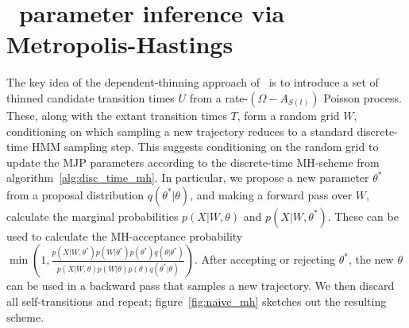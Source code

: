 \section{\Naive\ parameter inference via Metropolis-Hastings}

The key idea of the dependent-thinning approach of~\cite{RaoTeh13} is
to introduce a set of thinned candidate transition times $U$ from
a rate-$(\Omega-A_{S(t)})$ Poisson process. These, along 
with the extant transition times $T$, form a random grid $W$, conditioning on
which sampling a new trajectory reduces to a standard discrete-time 
HMM sampling step. This suggests conditioning on the random grid to update
the MJP parameters according to the discrete-time MH-scheme from
algorithm~\ref{alg:disc_time_mh}.
In particular, we propose a new parameter $\theta^*$ from a proposal 
distribution $q(\theta^*|\theta)$, and making a forward pass over $W$, calculate
the marginal probabilities $p(X|W,\theta)$ and $p(X|W,\theta^*)$. These can be
used to calculate the MH-acceptance probability $\min\left(1,
\frac{p(X|W,\theta^*)p(W|\theta^*)p(\theta^*)q(\theta|\theta^*)}
     {p(X|W,\theta)p(W|\theta)p(\theta)q(\theta^*|\theta)}\right)$. 
After accepting or rejecting $\theta^*$, the new $\theta$ can be used in
a backward pass that samples a new trajectory. We then discard all 
self-transitions and repeat; figure~\ref{fig:naive_mh} sketches out the resulting
scheme.

